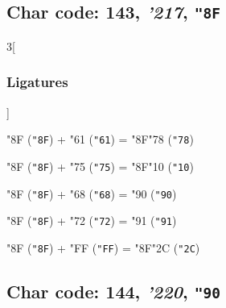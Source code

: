 \documentclass{article}
\newlength{\maxcharwidth}
\begin{document}
\subsection{Char code: 143, {\it'217}, {\tt"8F}}
\label{char_143}


\begin{multicols}{3}[\subsubsection{Ligatures}]

{\testfont\char"8F\noboundary} ({\tt"8F}) + {\testfont\char"61\noboundary} ({\tt"61}) = {\testfont\char"8F\noboundary}{\testfont\char"78\noboundary} ({\tt"78}) 

{\testfont\char"8F\noboundary} ({\tt"8F}) + {\testfont\char"75\noboundary} ({\tt"75}) = {\testfont\char"8F\noboundary}{\testfont\char"10\noboundary} ({\tt"10}) 

{\testfont\char"8F\noboundary} ({\tt"8F}) + {\testfont\char"68\noboundary} ({\tt"68}) = {\testfont\char"90\noboundary} ({\tt"90}) 

{\testfont\char"8F\noboundary} ({\tt"8F}) + {\testfont\char"72\noboundary} ({\tt"72}) = {\testfont\char"91\noboundary} ({\tt"91}) 

{\testfont\char"8F\noboundary} ({\tt"8F}) + {\testfont\char"FF\noboundary} ({\tt"FF}) = {\testfont\char"8F\noboundary}{\testfont\char"2C\noboundary} ({\tt"2C}) 

\end{multicols}

\subsection{Char code: 144, {\it'220}, {\tt"90}}
\label{char_144}

\end{document}
